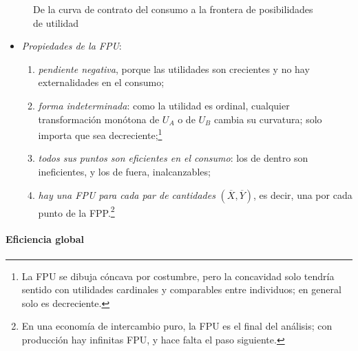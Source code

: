 \documentclass[11pt]{article}
\begin{document}
\begin{figure}[H]
\centering
\caption{De la curva de contrato del consumo a la frontera de posibilidades de utilidad}\label{fig:caja-consumo-fpu}
\end{figure}

\begin{itemize}
\item \emph{Propiedades de la FPU}:
  \begin{enumerate}
  \item \emph{pendiente negativa}, porque las utilidades son crecientes y no hay externalidades en el consumo;
  \item \emph{forma indeterminada}: como la utilidad es ordinal, cualquier transformación monótona de $U_A$ o de $U_B$ cambia su curvatura; solo importa que sea decreciente;\footnote{La FPU se dibuja cóncava por costumbre, pero la concavidad solo tendría sentido con utilidades cardinales y comparables entre individuos; en general solo es decreciente\nocite{HETParetoSocial}.}
  \item \emph{todos sus puntos son eficientes en el consumo}: los de dentro son ineficientes, y los de fuera, inalcanzables;
  \item \emph{hay una FPU para cada par de cantidades} $(\overline{X},\overline{Y})$, es decir, una por cada punto de la FPP.\footnote{En una economía de intercambio puro, la FPU es el final del análisis; con producción hay infinitas FPU, y hace falta el paso siguiente.}
  \end{enumerate}
\end{itemize}

\paragraph{Eficiencia global}
\end{document}
